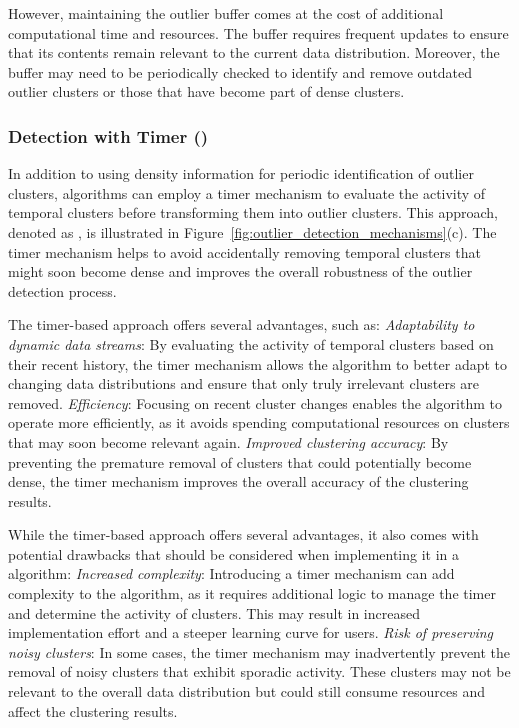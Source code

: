 However, maintaining the outlier buffer comes at the cost of additional computational time and resources. The buffer requires frequent updates to ensure that its contents remain relevant to the current data distribution. Moreover, the buffer may need to be periodically checked to identify and remove outdated outlier clusters or those that have become part of dense clusters.

\subcompact
\subsubsection{Detection with Timer (\timer)}
\label{subsec:timer}
In addition to using density information for periodic identification of outlier clusters, \dsc algorithms can employ a timer mechanism to evaluate the activity of temporal clusters before transforming them into outlier clusters. This approach, denoted as \timer, is illustrated in Figure~\ref{fig:outlier_detection_mechanisms}(c). The timer mechanism helps to avoid accidentally removing temporal clusters that might soon become dense and improves the overall robustness of the outlier detection process. 

The timer-based approach offers several advantages, such as:
\textit{Adaptability to dynamic data streams}: By evaluating the activity of temporal clusters based on their recent history, the timer mechanism allows the algorithm to better adapt to changing data distributions and ensure that only truly irrelevant clusters are removed.
\textit{Efficiency}: Focusing on recent cluster changes enables the \dsc algorithm to operate more efficiently, as it avoids spending computational resources on clusters that may soon become relevant again.
\textit{Improved clustering accuracy}: By preventing the premature removal of clusters that could potentially become dense, the timer mechanism improves the overall accuracy of the clustering results.

While the timer-based approach offers several advantages, it also comes with potential drawbacks that should be considered when implementing it in a \dsc algorithm: \textit{Increased complexity}: Introducing a timer mechanism can add complexity to the algorithm, as it requires additional logic to manage the timer and determine the activity of clusters. This may result in increased implementation effort and a steeper learning curve for users. \textit{Risk of preserving noisy clusters}: In some cases, the timer mechanism may inadvertently prevent the removal of noisy clusters that exhibit sporadic activity. These clusters may not be relevant to the overall data distribution but could still consume resources and affect the clustering results.

